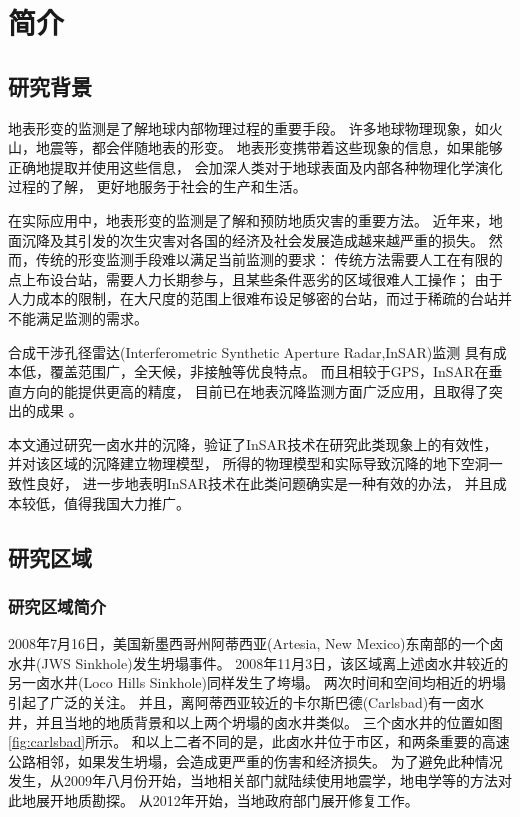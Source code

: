 
\chapter{简介}

\section{研究背景}

地表形变的监测是了解地球内部物理过程的重要手段。
许多地球物理现象，如火山，地震等，都会伴随地表的形变。
地表形变携带着这些现象的信息，如果能够正确地提取并使用这些信息，
会加深人类对于地球表面及内部各种物理化学演化过程的了解，
更好地服务于社会的生产和生活。

在实际应用中，地表形变的监测是了解和预防地质灾害的重要方法。
近年来，地面沉降及其引发的次生灾害对各国的经济及社会发展造成越来越严重的损失。
然而，传统的形变监测手段难以满足当前监测的要求：
传统方法需要人工在有限的点上布设台站，需要人力长期参与，且某些条件恶劣的区域很难人工操作；
由于人力成本的限制，在大尺度的范围上很难布设足够密的台站，而过于稀疏的台站并不能满足监测的需求。

合成干涉孔径雷达(Interferometric Synthetic Aperture Radar,InSAR)监测
具有成本低，覆盖范围广，全天候，非接触等优良特点。
而且相较于GPS，InSAR在垂直方向的能提供更高的精度，
目前已在地表沉降监测方面广泛应用，且取得了突出的成果
\cite{kimEvolutionSinkholesWink2019a,shiSubsidenceSinkholesWink2019a}。

本文通过研究一卤水井的沉降，验证了InSAR技术在研究此类现象上的有效性，
并对该区域的沉降建立物理模型，
所得的物理模型和实际导致沉降的地下空洞一致性良好，
进一步地表明InSAR技术在此类问题确实是一种有效的办法，
并且成本较低，值得我国大力推广。

\section{研究区域}

\subsection{研究区域简介}
2008年7月16日，美国新墨西哥州阿蒂西亚(Artesia, New Mexico)东南部的一个卤水井(JWS Sinkhole)发生坍塌事件。
2008年11月3日，该区域离上述卤水井较近的另一卤水井(Loco Hills Sinkhole)同样发生了垮塌。
两次时间和空间均相近的坍塌引起了广泛的关注。
并且，离阿蒂西亚较近的卡尔斯巴德(Carlsbad)有一卤水井，并且当地的地质背景和以上两个坍塌的卤水井类似。
三个卤水井的位置如图\ref{fig:carlsbad}所示。
和以上二者不同的是，此卤水井位于市区，和两条重要的高速公路相邻，如果发生坍塌，会造成更严重的伤害和经济损失。
为了避免此种情况发生，从2009年八月份开始，当地相关部门就陆续使用地震学，地电学等的方法对此地展开地质勘探。
从2012年开始，当地政府部门展开修复工作。

